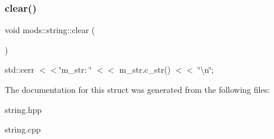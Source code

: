 \subsubsection{\texorpdfstring{clear()}{clear()}}
{\footnotesize\ttfamily void mods\+::string\+::clear (\begin{DoxyParamCaption}{ }\end{DoxyParamCaption})}

std\+::cerr $<$$<$\char`\"{}m\+\_\+str\+: \char`\"{} $<$$<$ m\+\_\+str.\+c\+\_\+str() $<$$<$ \char`\"{}\textbackslash{}n\char`\"{}; 

The documentation for this struct was generated from the following files\+:\begin{DoxyCompactItemize}
\item 
string.\+hpp\item 
string.\+cpp\end{DoxyCompactItemize}
